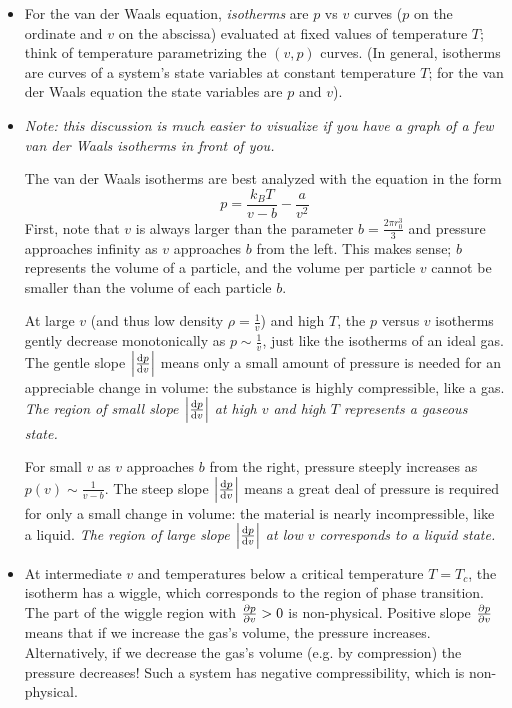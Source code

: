 \documentclass[11pt, a4paper]{article}
\begin{document}
\begin{itemize}
	\item For the van der Waals equation, \textit{isotherms} are $ p $ vs $ v $ curves ($ p $ on the ordinate and $ v $ on the abscissa) evaluated at fixed values of temperature $ T $; think of temperature parametrizing the $ (v, p) $ curves. (In general, isotherms are curves of a system's state variables at constant temperature $ T $; for the van der Waals equation the state variables are $ p $ and $ v $).
	
	\item 	\textit{Note: this discussion is much easier to visualize if you have a graph of a few van der Waals isotherms in front of you.}
	
	The van der Waals isotherms are best analyzed with the equation in the form
	\begin{equation*}
		p = \frac{k_{B}T}{v-b} - \frac{a}{v^{2}}
	\end{equation*}
	First, note that $ v $ is always larger than the parameter $ b = \frac{2\pi r_{0}^{3}}{3} $ and pressure approaches infinity as $ v $ approaches $ b $ from the left. This makes sense; $ b $ represents the volume of a particle, and the volume per particle $ v $ cannot be smaller than the volume of each particle $ b $.
				
	At large $ v $ (and thus low density $ \rho = \frac{1}{v} $) and high $ T $, the $ p $ versus $ v $ isotherms gently decrease monotonically as $ p \sim \frac{1}{v} $, just like the isotherms of an ideal gas. The gentle slope $ \abs{\dv{p}{v}} $ means only a small amount of pressure is needed for an appreciable change in volume: the substance is highly compressible, like a gas. \textit{The region of small slope $ \abs{\dv{p}{v}} $ at high $ v $ and high $ T $ represents a gaseous state.}
			
	For small $ v $ as $ v $ approaches $ b $ from the right, pressure steeply increases as $ p(v) \sim \frac{1}{v - b} $. The steep slope $ \abs{\dv{p}{v}} $ means a great deal of pressure is required for only a small change in volume: the material is nearly incompressible, like a liquid. \textit{The region of large slope $ \abs{\dv{p}{v}} $ at low $ v $ corresponds to a liquid state.}
		
	\item At intermediate $ v $ and temperatures below a critical temperature $ T = T_{c} $, the isotherm has a wiggle, which corresponds to the region of phase transition. The part of the wiggle region with $ \pdv{p}{v} > 0 $ is non-physical. Positive slope $ \pdv{p}{v} $ means that if we increase the gas's volume, the pressure increases. Alternatively, if we decrease the gas's volume (e.g. by compression) the pressure decreases! Such a system has negative compressibility, which is non-physical. 
	

\end{itemize}
\end{document}
